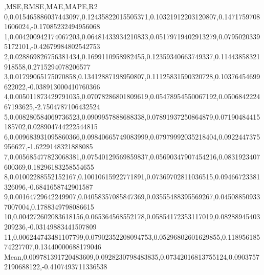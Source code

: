 ,MSE,RMSE,MAE,MAPE,R2
0,0.015465886037443097,0.12435822015505371,0.10321912203120807,0.14717597081606024,-0.17085232494956068
1,0.004200942174067203,0.06481433934210833,0.05179719402913279,0.07950203395172101,-0.42679984802542753
2,0.028869826756381434,0.1699110958982455,0.12359340663749337,0.11443858321918558,0.2715294078206577
3,0.01799065175070858,0.13412887198950807,0.11125831590320728,0.10376454699622022,-0.038913000410760366
4,0.005011873429791035,0.07078286801809619,0.05478954550067192,0.050684222467193625,-2.7504787106432524
5,0.008280584069736523,0.0909957888688338,0.07891937250864879,0.07190484415185702,0.028904744222544815
6,0.009683931095860366,0.09840665749083999,0.07979992035218404,0.0922447375956627,-1.6229148321888085
7,0.005685477823068381,0.07540129569859837,0.05690347907454216,0.0831923407600369,0.18296183258554655
8,0.01002288552152167,0.10010615922771891,0.07369702811036515,0.09466723381326096,-0.6841658742901587
9,0.00164729642249907,0.04058357085847369,0.03555488395569267,0.045088509337007004,0.1788349798086615
10,0.004272602083618156,0.065364568552178,0.05854172353117019,0.08288945403209236,-0.03149883441507809
11,0.006244743481107799,0.07902352208094753,0.05296802601629855,0.11895618574227707,0.13440000688179046
Mean,0.009781391720483609,0.0928230798483835,0.07342016813755124,0.09037572190688122,-0.4107493711336538
